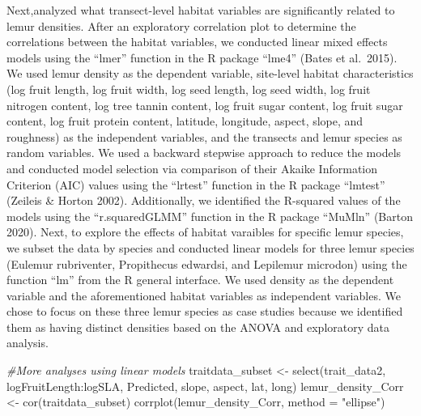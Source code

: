 \documentclass[
  12pt,
]{article}
\newenvironment{Shaded}{\begin{snugshade}}{\end{snugshade}}
\newcommand{\AttributeTok}[1]{\textcolor[rgb]{0.77,0.63,0.00}{#1}}
\newcommand{\CommentTok}[1]{\textcolor[rgb]{0.56,0.35,0.01}{\textit{#1}}}
\newcommand{\FunctionTok}[1]{\textcolor[rgb]{0.00,0.00,0.00}{#1}}
\newcommand{\NormalTok}[1]{#1}
\newcommand{\OtherTok}[1]{\textcolor[rgb]{0.56,0.35,0.01}{#1}}
\newcommand{\SpecialCharTok}[1]{\textcolor[rgb]{0.00,0.00,0.00}{#1}}
\newcommand{\StringTok}[1]{\textcolor[rgb]{0.31,0.60,0.02}{#1}}
\begin{document}
Next,analyzed what transect-level habitat variables are significantly
related to lemur densities. After an exploratory correlation plot to
determine the correlations between the habitat variables, we conducted
linear mixed effects models using the ``lmer'' function in the R package
``lme4'' (Bates et al.~2015). We used lemur density as the dependent
variable, site-level habitat characteristics (log fruit length, log
fruit width, log seed length, log seed width, log fruit nitrogen
content, log tree tannin content, log fruit sugar content, log fruit
sugar content, log fruit protein content, latitude, longitude, aspect,
slope, and roughness) as the independent variables, and the transects
and lemur species as random variables. We used a backward stepwise
approach to reduce the models and conducted model selection via
comparison of their Akaike Information Criterion (AIC) values using the
``lrtest'' function in the R package ``lmtest'' (Zeileis \& Horton
2002). Additionally, we identified the R-squared values of the models
using the ``r.squaredGLMM'' function in the R package ``MuMln'' (Barton
2020). Next, to explore the effects of habitat varaibles for specific
lemur species, we subset the data by species and conducted linear models
for three lemur species (Eulemur rubriventer, Propithecus edwardsi, and
Lepilemur microdon) using the function ``lm'' from the R general
interface. We used density as the dependent variable and the
aforementioned habitat variables as independent variables. We chose to
focus on these three lemur species as case studies because we identified
them as having distinct densities based on the ANOVA and exploratory
data analysis.

\begin{Shaded}
\begin{Highlighting}[]
\CommentTok{\#More analyses using linear models}
\NormalTok{traitdata\_subset }\OtherTok{\textless{}{-}} \FunctionTok{select}\NormalTok{(trait\_data2, logFruitLength}\SpecialCharTok{:}\NormalTok{logSLA, Predicted, slope, aspect, lat, long)}
\NormalTok{lemur\_density\_Corr }\OtherTok{\textless{}{-}} \FunctionTok{cor}\NormalTok{(traitdata\_subset)}
\FunctionTok{corrplot}\NormalTok{(lemur\_density\_Corr, }\AttributeTok{method =} \StringTok{"ellipse"}\NormalTok{)}
\end{Highlighting}
\end{Shaded}
\end{document}
